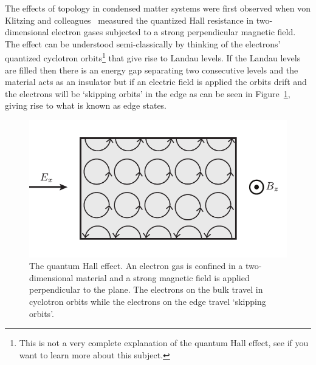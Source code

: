 The effects of topology in condensed matter systems were first observed when von Klitzing and colleagues~\cite{klitzing_new_1980} measured the quantized Hall resistance in two-dimensional electron gases subjected to a strong perpendicular magnetic field. The effect can be understood semi-classically by thinking of the electrons' quantized cyclotron orbits\footnote{This is not a very complete explanation of the quantum Hall effect, see \cite{tong_lectures_2016} if you want to learn more about this subject.} that give rise to Landau levels. If the Landau levels are filled then there is an energy gap separating two consecutive levels and the material acts as an insulator but if an electric field is applied the orbits drift and the electrons will be `skipping orbits' in the edge as can be seen in Figure~\ref{fig:quantum_hall}, giving rise to what is known as edge states.
% 
\begin{figure}[htb]
\begin{center}
\includegraphics[]{Figures/Chapter7/quantum_hall.pdf}
\caption[The quantum Hall effect]{The quantum Hall effect. An electron gas is confined in a two-dimensional material and a strong magnetic field is applied perpendicular to the plane. The electrons on the bulk travel in cyclotron orbits while the electrons on the edge travel `skipping orbits'.}
\label{fig:quantum_hall}
\end{center}
\end{figure}

